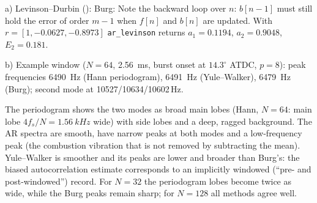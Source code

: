 \begin{solution}
a) Levinson--Durbin ():
Burg:
Note the backward loop over $n$: $b[n-1]$ must still hold the error of order $m-1$
when $f[n]$ and $b[n]$ are updated. With $r=[1,-0.0627,-0.8973]$ \texttt{ar\_levinson}
returns $a_1=0.1194$, $a_2=0.9048$, $E_2=0.181$.

b) Example window ($N=64$, \SI{2.56}{ms}, burst onset at $14.3^\circ$ ATDC, $p=8$):
peak frequencies \SI{6490}{Hz} (Hann periodogram), \SI{6491}{Hz} (Yule--Walker),
\SI{6479}{Hz} (Burg); second mode at 10527/10634/10602\,Hz.
\begin{center}
\end{center}
The periodogram shows the two modes as broad main lobes (Hann, $N=64$: main lobe
$4f_s/N=\SI{1.56}{kHz}$ wide) with side lobes and a deep, ragged background. The AR
spectra are smooth, have narrow peaks at both modes and a low-frequency peak (the
combustion vibration that is not removed by subtracting the mean). Yule--Walker is
smoother and its peaks are lower and broader than Burg's: the biased autocorrelation
estimate corresponds to an implicitly windowed (``pre- and post-windowed'') record.
For $N=32$ the periodogram lobes become twice as wide, while the Burg peaks remain
sharp; for $N=128$ all methods agree well.


\end{solution}
